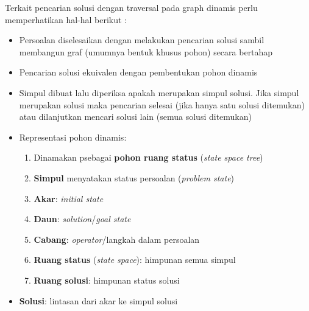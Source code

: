 \documentclass[12pt,a4paper]{article}
\begin{document}
Terkait pencarian solusi dengan traversal pada graph dinamis perlu memperhatikan hal-hal berikut \cite{stima-graph-2}:
\begin{itemize}
    \item Persoalan diselesaikan dengan melakukan pencarian solusi sambil membangun graf (umumnya bentuk khusus pohon) secara bertahap
    \item Pencarian solusi ekuivalen dengan pembentukan pohon dinamis
    \item Simpul dibuat lalu diperiksa apakah merupakan simpul solusi. Jika simpul merupakan solusi maka pencarian selesai (jika hanya satu solusi ditemukan) atau dilanjutkan mencari solusi lain (semua solusi ditemukan)
    \item Representasi pohon dinamis:
    \begin{enumerate}
        \item Dinamakan psebagai \textbf{pohon ruang status} (\textit{state space tree})
        \item \textbf{Simpul} menyatakan status persoalan (\textit{problem state})
        \item \textbf{Akar}: \textit{initial state}
        \item \textbf{Daun}: \textit{solution}/\textit{goal state}
        \item \textbf{Cabang}: \textit{operator}/langkah dalam persoalan
        \item \textbf{Ruang status} (\textit{state space}): himpunan semua simpul
        \item \textbf{Ruang solusi}: himpunan status solusi
    \end{enumerate}
    \item \textbf{Solusi}: lintasan dari akar ke simpul solusi
\end{itemize} \\
\end{document}
